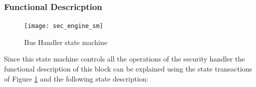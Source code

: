 \subsubsection{Functional Descricption}

\begin{figure}[!ht]
	\centering
	\texttt{[image: sec\_engine\_sm]}
    \caption{Bus Handler state machine  }
	\label{fig:phsm}
\end{figure}
Since this  state machine controls all the operations of the security handler the functional 
description of this block can be explained using the state transactions of Figure \ref{fig:phsm} and the 
following state description:

